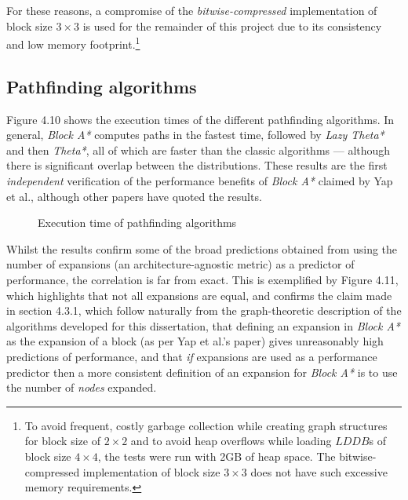 \documentclass[12pt,notitlepage]{report}
\begin{document}
\noindent
For these reasons, a compromise of the {\em bitwise-compressed} implementation of block size $3 \times 3$ is used for the remainder of this project due to its consistency and low memory footprint.\footnote{To avoid frequent, costly garbage collection while creating graph structures for block size of $2 \times 2$ and to avoid heap overflows while loading $LDDB$s of block size $4 \times 4$, the tests were run with 2GB of heap space. The bitwise-compressed implementation of block size $3 \times 3$ does not have such excessive memory requirements.}

\subsection{Pathfinding algorithms}
Figure 4.10 shows the execution times of the different pathfinding algorithms. In general, {\em Block A*} computes paths in the fastest time, followed by {\em Lazy Theta*} and then {\em Theta*}, all of which are faster than the classic algorithms --- although there is significant overlap between the distributions. These results are the first {\em independent} verification of the performance benefits of {\em Block A*} claimed by Yap et al., although other papers have quoted the results\cite{Nash12,Nash13}.\\

\begin{figure}
\centering

\caption{Execution time of pathfinding algorithms}
\end{figure}

\noindent 
Whilst the results confirm some of the broad predictions obtained from using the number of expansions (an architecture-agnostic metric) as a predictor of performance, the correlation is far from exact. This is exemplified by Figure 4.11, which highlights that not all expansions are equal, and confirms the claim made in section 4.3.1, which follow naturally from the graph-theoretic description of the algorithms developed for this dissertation, that defining an expansion in {\em Block A*} as the expansion of a block (as per Yap et al.'s paper) gives unreasonably high predictions of performance, and that {\em if} expansions are used as a performance predictor then a more consistent definition of an expansion for {\em Block A*} is to use the number of {\em nodes} expanded.\\
\end{document}
